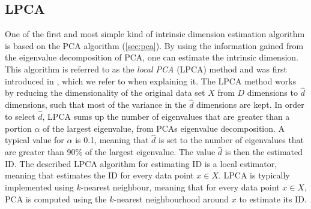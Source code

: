 \subsection{LPCA}
\label{sec:id-estimation-lpca}
One of the first and most simple kind of intrinsic dimension estimation algorithm is based on the PCA algorithm (\cref{sec:pca}). By using the information gained from the eigenvalue decomposition of PCA, one can estimate the intrinsic dimension. This algorithm is referred to as the \textit{local PCA} (LPCA) method and was first introduced in \cite{Fukunaga1971}, which we refer to when explaining it. The LPCA method works by reducing the dimensionality of the original data set $X$ from $D$ dimensions to $\hat{d}$ dimensions, such that most of the variance in the $\hat{d}$ dimensions are kept. In order to select $\hat{d}$, LPCA sums up the number of eigenvalues that are greater than a portion $\alpha$ of the largest eigenvalue, from PCAs eigenvalue decomposition. A typical value for $\alpha$ is 0.1, meaning that $\hat{d}$ is set to the number of eigenvalues that are greater than 90\% of the largest eigenvalue. The value $\hat{d}$ is then the estimated ID. The described LPCA algorithm for estimating ID is a local estimator, meaning that estimates the ID for every data point $x \in X$. LPCA is typically implemented using $k$-nearest neighbour, meaning that for every data point $x \in X$, PCA is computed using the $k$-nearest neighbourhood around $x$ to estimate its ID.

